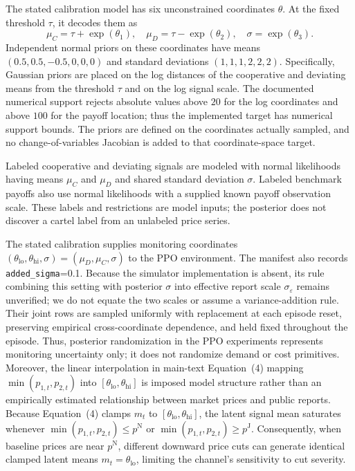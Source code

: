\documentclass{article}
\begin{document}
The stated calibration model has six unconstrained coordinates $\theta$. At the fixed threshold $\tau$, it decodes them as
\[
\mu_C = \tau + \exp(\theta_1), \quad \mu_D = \tau - \exp(\theta_2), \quad \sigma = \exp(\theta_3).
\]
Independent normal priors on these coordinates have means $(0.5, 0.5, -0.5, 0, 0, 0)$ and standard deviations $(1, 1, 1, 2, 2, 2)$. Specifically, Gaussian priors are placed on the log distances of the cooperative and deviating means from the threshold $\tau$ and on the log signal scale. The documented numerical support rejects absolute values above $20$ for the log coordinates and above $100$ for the payoff location; thus the implemented target has numerical support bounds. The priors are defined on the coordinates actually sampled, and no change-of-variables Jacobian is added to that coordinate-space target.

Labeled cooperative and deviating signals are modeled with normal likelihoods having means $\mu_C$ and $\mu_D$ and shared standard deviation $\sigma$. Labeled benchmark payoffs also use normal likelihoods with a supplied known payoff observation scale. These labels and restrictions are model inputs; the posterior does not discover a cartel label from an unlabeled price series.

The stated calibration supplies monitoring coordinates $(\theta_{\mathrm{lo}},\theta_{\mathrm{hi}},\sigma)=(\mu_D,\mu_C,\sigma)$ to the PPO environment. The manifest also records \texttt{added\_sigma}=0.1. Because the simulator implementation is absent, its rule combining this setting with posterior $\sigma$ into effective report scale $\sigma_\varepsilon$ remains unverified; we do not equate the two scales or assume a variance-addition rule. Their joint rows are sampled uniformly with replacement at each episode reset, preserving empirical cross-coordinate dependence, and held fixed throughout the episode. Thus, posterior randomization in the PPO experiments represents monitoring uncertainty only; it does not randomize demand or cost primitives. Moreover, the linear interpolation in main-text Equation~(4) mapping $\min(p_{1,t},p_{2,t})$ into $[\theta_{\mathrm{lo}},\theta_{\mathrm{hi}}]$ is imposed model structure rather than an empirically estimated relationship between market prices and public reports. Because Equation~(4) clamps $m_t$ to $[\theta_{\mathrm{lo}},\theta_{\mathrm{hi}}]$, the latent signal mean saturates whenever $\min(p_{1,t},p_{2,t}) \leq p^{\mathrm{N}}$ or $\min(p_{1,t},p_{2,t}) \geq p^{\mathrm{J}}$. Consequently, when baseline prices are near $p^{\mathrm{N}}$, different downward price cuts can generate identical clamped latent means $m_t = \theta_{\mathrm{lo}}$, limiting the channel's sensitivity to cut severity.
\end{document}
